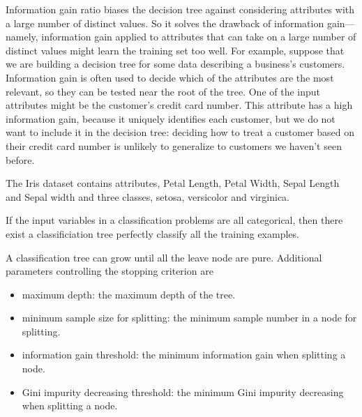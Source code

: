 \begin{refsection}
\begin{remark}
Information gain ratio biases the decision tree against considering attributes with a large number of distinct values. So it solves the drawback of information gain—namely, information gain applied to attributes that can take on a large number of distinct values might learn the training set too well. For example, suppose that we are building a decision tree for some data describing a business's customers. Information gain is often used to decide which of the attributes are the most relevant, so they can be tested near the root of the tree. One of the input attributes might be the customer's credit card number. This attribute has a high information gain, because it uniquely identifies each customer, but we do not want to include it in the decision tree: deciding how to treat a customer based on their credit card number is unlikely to generalize to customers we haven't seen before.	
\end{remark}




\begin{remark}
The Iris dataset contains attributes, Petal Length, Petal Width, Sepal Length and Sepal width and three classes, setosa, versicolor and virginica.	

\end{remark}




\begin{remark}
If the input variables in a classification problems are all categorical, then there exist a classificiation tree perfectly classify all the training examples.	
\end{remark}



\begin{remark}
A classification tree can grow until all the leave node are pure. Additional parameters controlling the stopping criterion are
\begin{itemize}
	\item maximum depth: the maximum depth of the tree.
	\item minimum sample size for splitting: the minimum sample number in a node for splitting.
	\item information gain threshold: the minimum information gain when splitting a node. 
	\item Gini impurity decreasing threshold: the minimum Gini impurity decreasing when splitting a node.
\end{itemize}	
\end{remark}





\end{refsection}
